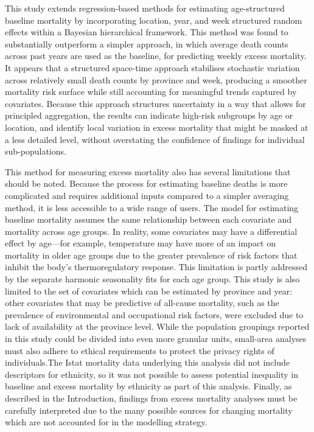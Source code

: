 \documentclass[
]{report}
\begin{document}
This study extends regression-based methods for estimating age-structured baseline mortality by incorporating location, year, and week structured random effects within a Bayesian hierarchical framework\autocite{Serfling1963,Ederer1961}. This method was found to substantially outperform a simpler approach, in which average death counts across past years are used as the baseline, for predicting weekly excess mortality. It appears that a structured space-time approach stabilises stochastic variation across relatively small death counts by province and week, producing a smoother mortality risk surface while still accounting for meaningful trends captured by covariates. Because this approach structures uncertainty in a way that allows for principled aggregation, the results can indicate high-risk subgroups by age or location, and identify local variation in excess mortality that might be masked at a less detailed level, without overstating the confidence of findings for individual sub-populations.

This method for measuring excess mortality also has several limitations that should be noted. Because the process for estimating baseline deaths is more complicated and requires additional inputs compared to a simpler averaging method, it is less accessible to a wide range of users. The model for estimating baseline mortality assumes the same relationship between each covariate and mortality across age groups. In reality, some covariates may have a differential effect by age---for example, temperature may have more of an impact on mortality in older age groups due to the greater prevalence of risk factors that inhibit the body's thermoregulatory response\autocite{Yu2010,Stafoggia2008}. This limitation is partly addressed by the separate harmonic seasonality fits for each age group. This study is also limited to the set of covariates which can be estimated by province and year: other covariates that may be predictive of all-cause mortality, such as the prevalence of environmental and occupational risk factors, were excluded due to lack of availability at the province level. While the population groupings reported in this study could be divided into even more granular units, small-area analyses must also adhere to ethical requirements to protect the privacy rights of individuals\autocite{Bayer2000}.The Istat mortality data underlying this analysis did not include descriptors for ethnicity, so it was not possible to assess potential inequality in baseline and excess mortality by ethnicity as part of this analysis. Finally, as described in the Introduction, findings from excess mortality analyses must be carefully interpreted due to the many possible sources for changing mortality which are not accounted for in the modelling strategy.
\end{document}
